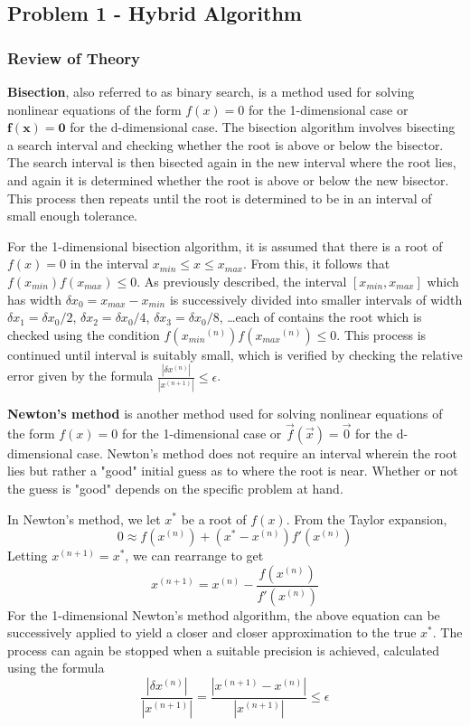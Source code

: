 \documentclass[10pt]{article}
\begin{document}
\subsection*{Problem 1 - Hybrid Algorithm}

\subsubsection*{Review of Theory}

\textbf{Bisection}, also referred to as binary search, is a method used for solving nonlinear equations of the 
form $f(x)=0$ for the 1-dimensional case or $\mathbf{f}(\mathbf{x})=\mathbf{0}$ for the d-dimensional case. The
bisection algorithm involves bisecting a search interval and checking whether the root is above or 
below the bisector. The search interval is then bisected again in the new interval where the root lies, 
and again it is determined whether the root is above or below the new bisector. This process then repeats
until the root is determined to be in an interval of small enough tolerance. 

For the 1-dimensional bisection algorithm, it is assumed that there is a root of $f(x)=0$ in the interval
$x_{min} \leq x \leq x_{max}$. From this, it follows that $f(x_{min})f(x_{max}) \leq 0$. As previously 
described, the interval $[x_{min}, x_{max}]$ which has width $\delta x_0 = x_{max} - x_{min}$ is
successively divided into smaller intervals of width $\delta x_1 = \delta x_0/2$, 
$\delta x_2 = \delta x_0/4$, $\delta x_3 = \delta x_0/8$, \ldots each of contains the root which is 
checked using the condition $f({x_{min}}^{(n)})f({x_{max}}^{(n)}) \leq 0$. This process is continued until 
interval is suitably small, which is verified by checking the relative error given by the formula
$\frac{| \delta x^{(n)} |}{| x^{(n+1)} |} \leq \epsilon$.

\textbf{Newton's method} is another method used for solving nonlinear equations of the form $f(x)=0$ for the 
1-dimensional case or $\vec{f}(\vec{x})=\vec{0}$ for the d-dimensional case. Newton's method does not 
require an interval wherein the root lies but rather a "good" initial guess as to where the root is near.
Whether or not the guess is "good" depends on the specific problem at hand.

In Newton's method, we let $x^*$ be a root of $f(x)$. From the Taylor expansion,
$$0 \approx f(x^{(n)}) + (x^* - x^{(n)})f'(x^{(n)})$$
Letting $x^{(n+1)} = x^*$, we can rearrange to get
$$x^{(n+1)} = x^{(n)} - \frac{f(x^{(n)})}{f'(x^{(n)})}$$
For the 1-dimensional Newton's method algorithm, the above equation can be successively applied to yield a 
closer and closer approximation to the true $x^*$. The process can again be stopped when a suitable precision
is achieved, calculated using the formula 
$$\frac{| \delta x^{(n)} |}{| x^{(n+1)} |} = \frac{| x^{(n+1)}-x^{(n)} |}{| x^{(n+1)} |} \leq \epsilon$$
\end{document}
